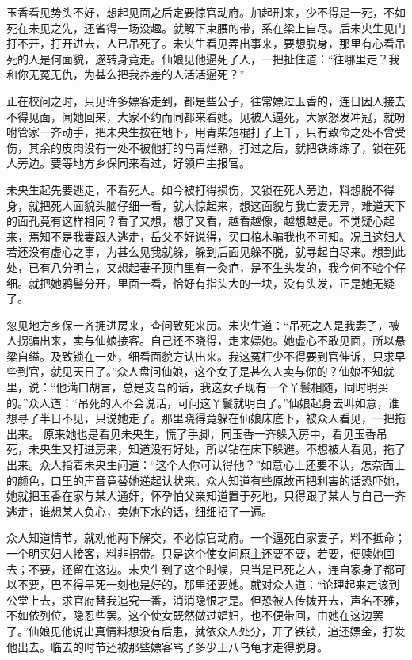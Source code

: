 \documentclass[a4paper,12pt,UTF8,twoside]{ctexbook}
\begin{document}
玉香看见势头不好，想起见面之后定要惊官动府。加起刑来，少不得是一死，不如死在未见之先，还省得一场没趣。就解下束腰的带，系在梁上自尽。后未央生见门打不开，打开进去，人已吊死了。未央生看见弄出事来，要想脱身，那里有心看吊死的人是何面貌，遂转身竟走。仙娘见他逼死了人，一把扯住道：“往哪里走？我和你无冤无仇，为甚么把我养差的人活活逼死？”

正在校问之时，只见许多嫖客走到，都是些公子，往常嫖过玉香的，连日因人接去不得见面，闻她回来，大家不约而同都来看她。见被人逼死，大家怒发冲冠，就吩咐管家一齐动手，把未央生按在地下，用青柴短棍打了上千，只有致命之处不曾受伤，其余的皮肉没有一处不被他打的乌青烂熟，打过之后，就把铁练练了，锁在死人旁边。要等地方乡保同来看过，好领户主报官。

未央生起先要逃走，不看死人。如今被打得损伤，又锁在死人旁边，料想脱不得身，就把死人面貌头脑仔细一看，就大惊起来，想这面貌与我亡妻无异，难道天下的面孔竟有这样相同？看了又想，想了又看，越看越像，越想越是。不觉疑心起来，焉知不是我妻跟人逃走，岳父不好说得，买口棺木骗我也不可知。况且这妇人若还没有虚心之事，为甚么见我就躲，躲到后面见躲不脱，就寻起自尽来。想到此处，已有八分明白，又想起妻子顶门里有一灸疤，是不生头发的，我今何不验个仔细。就把她鸦髻分开，里面一看，恰好有指头大的一块，没有头发，正是她无疑了。

忽见地方乡保一齐拥进房来，查问致死来历。未央生道：“吊死之人是我妻子，被人拐骗出来，卖与仙娘接客。自己还不晓得，走来嫖她。她虚心不敢见面，所以悬梁自缢。及致锁在一处，细看面貌方认出来。我这冤枉少不得要到官伸诉，只求早些到官，就见天日了。”众人盘问仙娘，这个女子是甚么人卖与你的？仙娘不知就里，说：“他满口胡言，总是支吾的话，我这女子现有一个丫鬟相随，同时明买的。”众人道：“吊死的人不会说话，可问这丫鬟就明白了。”仙娘起身去叫如意，谁想寻了半日不见，只说她走了。那里晓得竟躲在仙娘床底下，被众人看见，一把拖出来。 原来她也是看见未央生，慌了手脚，同玉香一齐躲入房中，看见玉香吊死，未央生又打进房来，知道没有好处，所以钻在床下躲避。不想被人看见，拖了出来。众人指着未央生问道：“这个人你可认得他？”如意心上还要不认，怎奈面上的颜色，口里的声音竟替她递起认状来。众人知道有些原故再把利害的话恐吓她，她就把玉香在家与某人通奸，怀孕怕父亲知道置于死地，只得跟了某人与自己一齐逃走，谁想某人负心，卖她下水的话，细细招了一遍。

众人知道情节，就劝他两下解交，不必惊官动府。一个逼死自家妻子，料不抵命；一个明买妇人接客，料非拐带。只是这个使女问原主还要不要，若要，便赎她回去；不要，还留在这边。未央生到了这个时候，只当是已死之人，连自家身子都可以不要，巴不得早死一刻也是好的，那里还要她。就对众人道：“论理起来定该到公堂上去，求官府替我追究一番，消消隐恨才是。但恐被人传拨开去，声名不雅，不如依列位，隐忍些罢。这个使女既然做过娼妇，也不便带回，由她在这边罢了。”仙娘见他说出真情料想没有后患，就依众人处分，开了铁锁，追还嫖金，打发他出去。临去的时节还被那些嫖客骂了多少王八乌龟才走得脱身。
\end{document}
